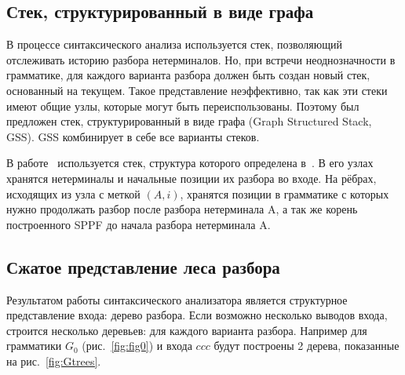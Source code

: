 \documentclass[14pt]{matmex-diploma-custom}
\begin{document}
	\subsection{Стек, структурированный в виде графа}
	В процессе синтаксического анализа используется стек, позволяющий отслеживать историю 
	разбора нетерминалов. Но, при встречи неоднозначности в грамматике, для каждого варианта 
    разбора должен быть создан новый стек, основанный на текущем. Такое представление неэффективно, так как эти стеки имеют общие узлы,
    которые могут быть переиспользованы. Поэтому был предложен стек, структурированный в виде графа
    (Graph Structured Stack, GSS). GSS комбинирует в себе все варианты стеков.
    
    В работе~\cite{ragozina} используется стек, структура которого определена в~\cite{afroozeh2015faster}.
    В его узлах хранятся нетерминалы и начальные позиции их разбора во входе.
    На рёбрах, исходящих из узла с меткой $(A, i)$, хранятся позиции в грамматике с которых нужно
    продолжать разбор после разбора нетерминала A, а так же корень построенного SPPF до начала 
    разбора нетерминала A.
    
	\subsection{Сжатое представление леса разбора}
	Результатом работы синтаксического анализатора является структурное представление
    входа: дерево разбора. Если возможно несколько выводов входа, строится несколько деревьев:
    для каждого варианта разбора. Например для грамматики $G_0$ (рис.~\ref{fig:fig0}) и входа $ccc$
    будут построены 2 дерева, показанные на рис.~\ref{fig:Gtrees}.
    
\end{document}
